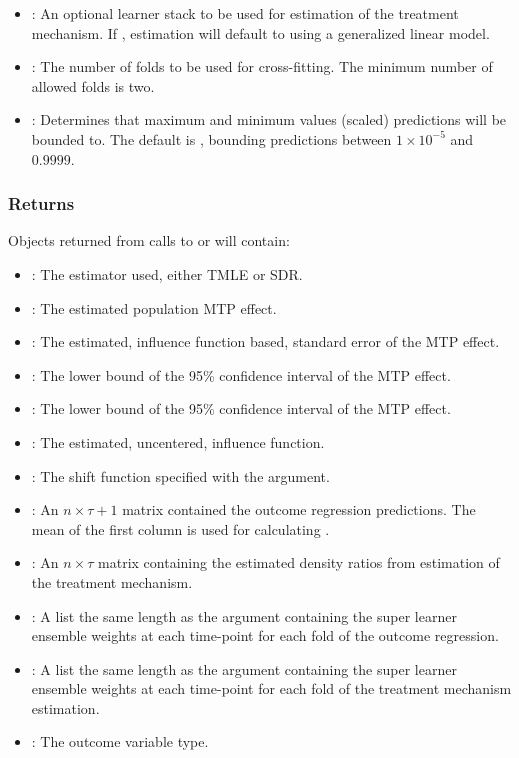 \documentclass[]{jss}
\begin{document}
\begin{itemize}
  \item {}: An optional  learner stack to be used for estimation
  of the treatment mechanism. If , estimation will default to using a generalized linear model.
  \item {}: The number of folds to be used for cross-fitting. The minimum number of allowed folds is two.
  \item {}: Determines that maximum and minimum values (scaled) predictions will be
  bounded to. The default is , bounding predictions between \(1\times10^{-5}\) and \(0.9999\).
  
\end{itemize}

\subsubsection{Returns}

Objects returned from calls to  or  will contain:

\begin{itemize}

  \item {}: The estimator used, either TMLE or SDR.
  \item {}: The estimated population MTP effect.
  \item {}: The estimated, influence function based, standard error of
  the MTP effect.
  \item {}: The lower bound of the 95\% confidence interval of the MTP effect.
  \item {}: The lower bound of the 95\% confidence interval of the MTP effect.
  \item {}: The estimated, uncentered, influence function.
  \item {}: The shift function specified with the  argument.
  \item {}: An \(n \times \tau + 1\) matrix contained the outcome regression
  predictions. The mean of the first column is used for calculating .
  \item {}: An \(n \times \tau\) matrix containing the estimated density
  ratios from estimation of the treatment mechanism.
  \item {}: A list the same length as the  argument containing the
  super learner ensemble weights at each time-point for each fold of the outcome regression.
  \item {}: A list the same length as the  argument containing the
  super learner ensemble weights at each time-point for each fold of the treatment mechanism
  estimation.
  \item {}: The outcome variable type.
  
\end{itemize}
\end{document}
